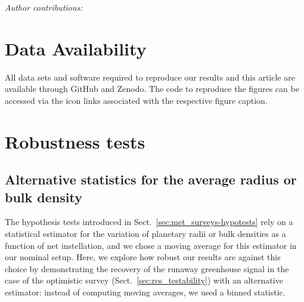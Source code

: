 \documentclass[twocolumn,twocolappendix]{aastex631}
\begin{document}

\begin{large}\textit{Author contributions:}\end{large}

\section*{Data Availability}
All data sets and software required to reproduce our results and this article are available through GitHub and Zenodo.
The code to reproduce the figures can be accessed via the icon links associated with the respective figure caption.




\appendix
\section{Robustness tests}
\subsection{Alternative statistics for the average radius or bulk density}\label{app:binnedstats}
The hypothesis tests introduced in Sect.~\ref{sec:met_surveys-hypotests} rely on a statistical estimator for the variation of planetary radii or bulk densities as a function of net instellation, and we chose a moving average for this estimator in our nominal setup.
Here, we explore how robust our results are against this choice by demonstrating the recovery of the runaway greenhouse signal in the case of the optimistic survey (Sect.~\ref{sec:res_testability}) with an alternative estimator: instead of computing moving averages, we used a binned statistic.
\end{document}
